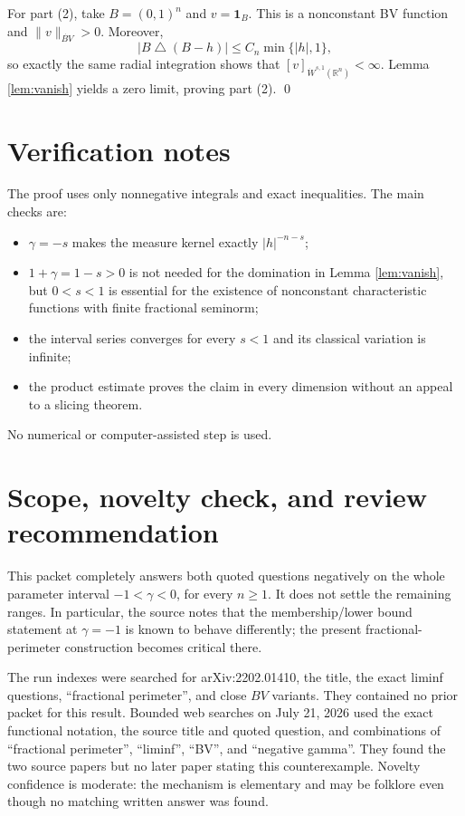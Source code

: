 \documentclass[11pt]{article}
\newcommand{\R}{\mathbb R}
\newcommand{\BV}{\dot{BV}}
\begin{document}
For part (2), take $B=(0,1)^n$ and $v=\mathbf1_B$.  This is a nonconstant BV
function and $\|v\|_{\BV}>0$.  Moreover,
\[
 |B\mathbin\triangle(B-h)|\leq C_n\min\{|h|,1\},
\]
so exactly the same radial integration shows that
$[v]_{\dot W^{s,1}(\R^n)}<\infty$.  Lemma \ref{lem:vanish} yields a zero
limit, proving part (2). \qed

\section*{Verification notes}

The proof uses only nonnegative integrals and exact inequalities.  The main
checks are:
\begin{itemize}
\item $\gamma=-s$ makes the measure kernel exactly $|h|^{-n-s}$;
\item $1+\gamma=1-s>0$ is not needed for the domination in Lemma
  \ref{lem:vanish}, but $0<s<1$ is essential for the existence of nonconstant
  characteristic functions with finite fractional seminorm;
\item the interval series converges for every $s<1$ and its classical
  variation is infinite;
\item the product estimate proves the claim in every dimension without an
  appeal to a slicing theorem.
\end{itemize}
No numerical or computer-assisted step is used.

\section*{Scope, novelty check, and review recommendation}

This packet completely answers both quoted questions negatively on the whole
parameter interval $-1<\gamma<0$, for every $n\geq1$.  It does not settle the
remaining ranges.  In particular, the source notes that the membership/lower
bound statement at $\gamma=-1$ is known to behave differently; the present
fractional-perimeter construction becomes critical there.

The run indexes were searched for arXiv:2202.01410, the title, the exact
liminf questions, ``fractional perimeter'', and close $BV$ variants.  They
contained no prior packet for this result.  Bounded web searches on July 21,
2026 used the exact functional notation, the source title and quoted question,
and combinations of ``fractional perimeter'', ``liminf'', ``BV'', and
``negative gamma''.  They found the two source papers but no later paper
stating this counterexample.  Novelty confidence is moderate: the mechanism
is elementary and may be folklore even though no matching written answer was
found.
\end{document}
